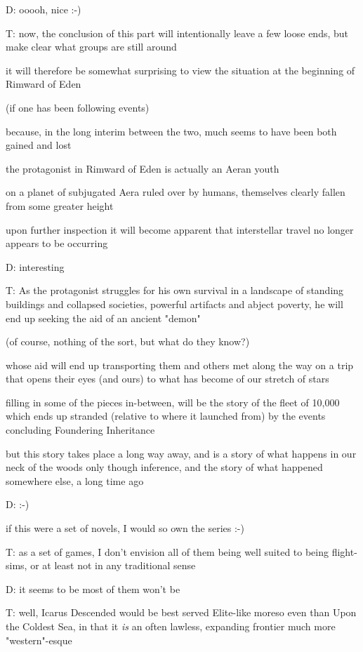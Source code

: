 D: ooooh, nice :-)

T: now, the conclusion of this part will intentionally leave a few loose ends, but make clear what groups are still around

it will therefore be somewhat surprising to view the situation at the beginning of Rimward of Eden

(if one has been following events)

because, in the long interim between the two, much seems to have been both gained and lost

the protagonist in Rimward of Eden is actually an Aeran youth

on a planet of subjugated Aera ruled over by humans, themselves clearly fallen from some greater height 

upon further inspection it will become apparent that interstellar travel no longer appears to be occurring

D: interesting

T: As the protagonist struggles for his own survival in a landscape of standing buildings and collapsed societies, powerful artifacts and abject poverty, he will end up seeking the aid of an ancient "demon"

(of course, nothing of the sort, but what do they know?)

whose aid will end up transporting them and others met along the way on a trip that opens their eyes (and ours) to what has become of our stretch of stars

filling in some of the pieces in-between, will be the story of the fleet of 10,000 which ends up stranded (relative to where it launched from) by the events concluding Foundering Inheritance

but this story takes place a long way away, and is a story of what happens in our neck of the woods only though inference, and the story of what happened somewhere else, a long time ago

D: :-)

if this were a set of novels, I would so own the series :-)

T: as a set of games, I don't envision all of them being well suited to being flight-sims, or at least not in any traditional sense

D: it seems to be most of them won't be

T: well, Icarus Descended would be best served Elite-like
moreso even than Upon the Coldest Sea, in that it {\em is} an often lawless, expanding frontier
much more "western"-esque

